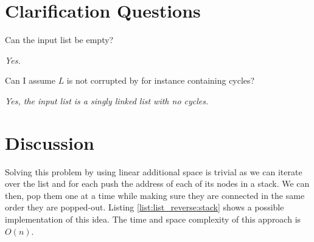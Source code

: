 

\section{Clarification Questions}

\begin{QandA}
	\item Can the input list be empty? 
	\begin{answered}
		\textit{Yes.}
	\end{answered}

	\item Can I assume $L$ is not corrupted by for instance containing cycles? 
	\begin{answered}
		\textit{Yes, the input list is a singly linked list with no cycles.}
	\end{answered}
	
\end{QandA}

\section{Discussion}
\label{list_reverse:sec:discussion}
Solving this problem by using linear additional space is  trivial as we can iterate over the list
and for each push the address of each of its nodes in a stack. We can then, pop them one at a time
while making sure they are connected in the same order they are popped-out. Listing
\ref{list:list_reverse:stack} shows a possible implementation of this idea. The time and space
complexity of this approach is $O(n)$.



